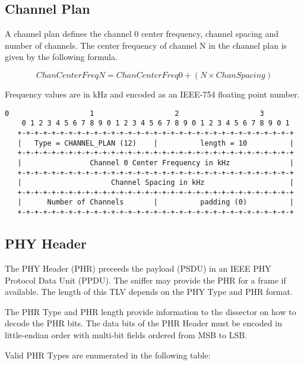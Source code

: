 \documentclass[12pt]{article}
\renewcommand\_{\textunderscore\allowbreak}
\begin{document}
\newpage
\subsection{Channel Plan}
 
A channel plan defines the channel 0 center frequency, channel spacing and
number of channels.  The center frequency of channel N in the channel plan is
given by the following formula.

\[ ChanCenterFreqN = ChanCenterFreq0 + (N \times ChanSpacing) \]
 
Frequency values are in kHz and encoded as an IEEE-754 floating point number.
 
\begin{Verbatim}[samepage=true]
    0                   1                   2                   3
    0 1 2 3 4 5 6 7 8 9 0 1 2 3 4 5 6 7 8 9 0 1 2 3 4 5 6 7 8 9 0 1
   +-+-+-+-+-+-+-+-+-+-+-+-+-+-+-+-+-+-+-+-+-+-+-+-+-+-+-+-+-+-+-+-+
   |   Type = CHANNEL_PLAN (12)    |          length = 10          |
   +-+-+-+-+-+-+-+-+-+-+-+-+-+-+-+-+-+-+-+-+-+-+-+-+-+-+-+-+-+-+-+-+
   |                Channel 0 Center Frequency in kHz              |
   +-+-+-+-+-+-+-+-+-+-+-+-+-+-+-+-+-+-+-+-+-+-+-+-+-+-+-+-+-+-+-+-+
   |                     Channel Spacing in kHz                    |
   +-+-+-+-+-+-+-+-+-+-+-+-+-+-+-+-+-+-+-+-+-+-+-+-+-+-+-+-+-+-+-+-+
   |      Number of Channels       |          padding (0)          |
   +-+-+-+-+-+-+-+-+-+-+-+-+-+-+-+-+-+-+-+-+-+-+-+-+-+-+-+-+-+-+-+-+
\end{Verbatim}

\subsection{PHY Header}

The PHY Header (PHR) preceeds the payload (PSDU) in an IEEE PHY Protocol Data
Unit (PPDU).  The sniffer may provide the PHR for a frame if available.
The length of this TLV depends on the PHY Type and PHR format.

The PHR Type and PHR length provide information to the dissector on how to
decode the PHR bits.  The data bits of the PHR Header must be encoded in
little-endian order with multi-bit fields ordered from MSB to LSB.

Valid PHR Types are enumerated in the following table:
\end{document}
